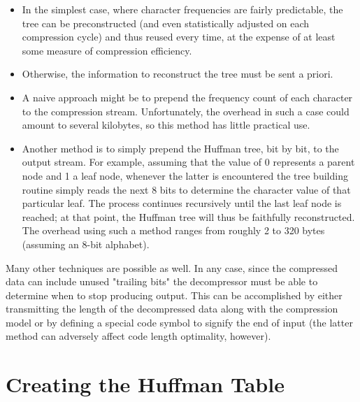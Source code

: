 \documentclass[12pt]{report}
\begin{document}
\begin{itemize}
\item In the simplest case, where character frequencies are fairly predictable, the tree can be preconstructed (and even statistically adjusted on each compression cycle) and thus reused every time, at the expense of at least some measure of compression efficiency.

\item Otherwise, the information to reconstruct the tree must be sent a priori.

\item A naive approach might be to prepend the frequency count of each character to the compression stream. Unfortunately, the overhead in such a case could amount to several kilobytes, so this method has little practical use.

\item Another method is to simply prepend the Huffman tree, bit by bit, to the output stream. For example, assuming that the value of 0 represents a parent node and 1 a leaf node, whenever the latter is encountered the tree building routine simply reads the next 8 bits to determine the character value of that particular leaf. The process continues recursively until the last leaf node is reached; at that point, the Huffman tree will thus be faithfully reconstructed. The overhead using such a method ranges from roughly 2 to 320 bytes (assuming an 8-bit alphabet). 

\begin{figure}[h!]
	\centering
\end{figure}

\end{itemize}

Many other techniques are possible as well. In any case, since the compressed data can include unused "trailing bits" the decompressor must be able to determine when to stop producing output. This can be accomplished by either transmitting the length of the decompressed data along with the compression model or by defining a special code symbol to signify the end of input (the latter method can adversely affect code length optimality, however).


\section{Creating the Huffman Table}
\end{document}
